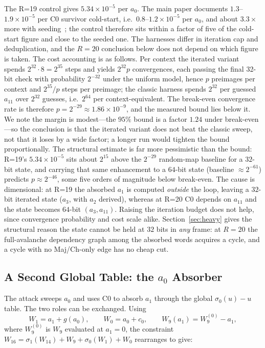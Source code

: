 \documentclass[11pt,a4paper]{article}
\newcommand{\sig}[1]{\sigma_{#1}}
\begin{document}
The R=19 control gives $5.34\times10^{-5}$ per $a_0$.  The main paper
documents $1.3$--$1.9\times10^{-5}$ per C0 survivor cold-start, i.e.\
$0.8$--$1.2\times10^{-5}$ per $a_0$, and about $3.3\times$ more with
seeding~\cite[\S5.4]{Basra2026R19}; the control therefore sits within a
factor of five of the cold-start figure and close to the seeded one.  The
harnesses differ in iteration cap and deduplication, and the $R{=}20$
conclusion below does not depend on which figure is taken.  The cost
accounting is as follows.  Per context the iterated variant spends
$2^{32}\cdot 8 = 2^{35}$ steps and yields $2^{32}p$ convergences, each
passing the final 32-bit check with probability $2^{-32}$ under the uniform
model, hence $p$ preimages per context and $2^{35}/p$ steps per preimage;
the classic harness spends $2^{32}$ per guessed $a_{11}$ over $2^{32}$
guesses, i.e.\ $2^{64}$ per context-equivalent.  The break-even
convergence rate is therefore $p = 2^{-29}\approx1.86\times10^{-9}$, and
the measured bound lies below it.  We note the margin is modest---the $95\%$
bound is a factor $1.24$ under break-even---so the conclusion is that the
iterated variant does not beat the classic sweep, not that it loses by a wide
factor; a longer run would tighten the bound proportionally.  The structural
estimate is far more pessimistic than the bound: R=19's $5.34\times10^{-5}$ sits
about $2^{15}$ above the $2^{-29}$ random-map baseline for a $32$-bit state, and
carrying that same enhancement to a $64$-bit state (baseline $\approx2^{-61}$)
predicts $p\approx2^{-46}$, some five orders of magnitude below break-even.  The cause is dimensional: at R=19 the absorbed
$a_1$ is computed \emph{outside} the loop, leaving a $32$-bit iterated state
($a_3$, with $a_2$ derived), whereas at R=20 C0 depends on $a_{11}$ and the state
becomes $64$-bit $(a_3,a_{11})$.  Raising the iteration budget does not help, since
convergence probability and cost scale alike.  Section~\ref{sec:heavy} gives the
structural reason the state cannot be held at $32$ bits in \emph{any} frame:
at $R{=}20$ the full-avalanche dependency graph among the absorbed words
acquires a cycle, and a cycle with no Maj/Ch-only edge has no cheap cut.

\subsection{A Second Global Table: the \texorpdfstring{$a_0$}{a0} Absorber}
\label{sec:a0absorber}

The attack sweeps $a_0$ and uses C0 to absorb $a_1$ through the global
$\sig{0}(u)-u$ table.  The two roles can be exchanged.  Using
\[
  W_1 = a_1 + g(a_0), \qquad W_0 = a_0 + c_0, \qquad
  W_9(a_1) = W_9^{(0)} - a_1,
\]
where $W_9^{(0)}$ is $W_9$ evaluated at $a_1=0$, the constraint
$W_{16} = \sig{1}(W_{14}) + W_9 + \sig{0}(W_1) + W_0$ rearranges to give:
\end{document}
